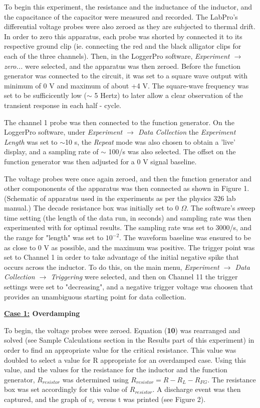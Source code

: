 \documentclass[twocolumn, letterpaper, 10pt, twoside]{article}
\begin{document}
   
   \indent\indent To begin this experiment, the resistance and the inductance of the inductor, and the capacitance of the capacitor were measured and recorded. The LabPro's differential voltage probes were also zeroed as they are subjected to thermal drift. In order to zero this apparatus, each probe was shorted by connected it to its respective ground clip (ie. connecting the red and the black alligator clips for each of the three channels). Then, in the LoggerPro software, \textit{Experiment $\rightarrow$ zero...}  were selected, and the apparatus was then zeroed. Before the function generator was connected to the circuit, it was set to a square wave output with minimum of 0 V and maximum of about +4 V. The square-wave frequency was set to be sufficicently low ($\sim$ 5 Hertz) to later allow a clear observation of the transient response in each half - cycle. 
   
   The channel 1 probe was then connected to the function generator. On the LoggerPro software, under \textit{Experiment $\rightarrow$ Data Collection} the \textit{Experiment Length} was set to $\sim$10 s, the \textit{Repeat} mode was also chosen to obtain a 'live' display, and a sampling rate of $\sim$ 100/s was also selected. The offset on the function generator was then adjusted for a 0 V signal baseline.
   
   The voltage probes were once again zeroed, and then the function generator and other compononents of the apparatus was then connected as shown in Figure 1. (Schematic of apparatus used in the experiments as per the physics 326 lab manual.) The decade resistance box was initially set to 0 $\Omega$. The software's sweep time setting (the length of the data run, in seconds) and sampling rate was then experimented with for optimal results. The sampling rate was set to 3000/s, and the range for "length" was set to $10^{-2}$. The waveform baseline was ensured to be as close to 0 V as possible, and the maximum was positive.  The trigger point was set to Channel 1 in order to take advantage of the initial negative spike that occurs across the inductor. To do this, on the main menu, \textit{Experiment $\rightarrow$ Data Collection $\rightarrow$ Triggering} were selected, and then on Channel 11 the trigger settings were set to "decreasing", and a negative trigger voltage was choosen that provides an unambiguous starting point for data collection. 
   
   \textbf{\underline{Case 1:} Overdamping}
   
   To begin, the voltage probes were zeroed. Equation (\textbf{10}) was rearranged and solved (see Sample Calculations section in the Results part of this experiment) in order to find an appropriate value for the critical resistance. This value was doubled to select a value for R appropriate for an overdamped case. Using this value, and the values for the resistance for the inductor and the function generator, $R_{resistor}$ was determined using $R_{resistor} = R - R_L - R_{FG}$. The resistance box was set accordingly for this value of $R_{resistor}$. A discharge event was then captured, and the graph of $v_c$ versus t was printed (see Figure 2). 
   
\end{document}
